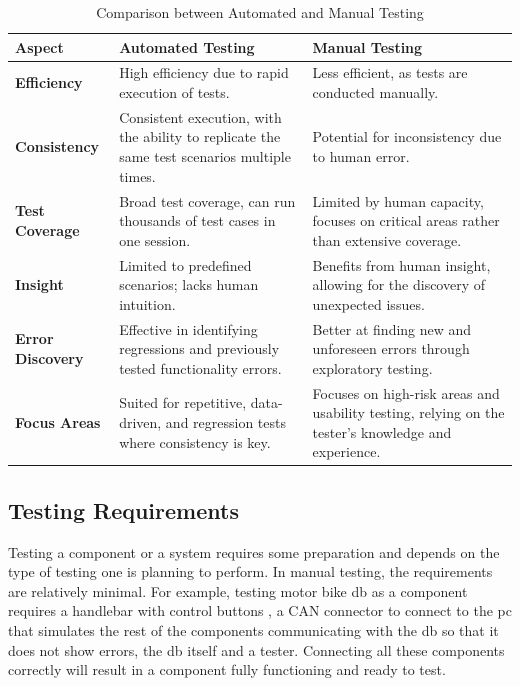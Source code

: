 \begin{table}[ht]
\centering
\caption{Comparison between Automated and Manual Testing \cite{leloudas2023, shiwangi2014}}
\label{tab:comparison automated vs manual testing}
\begin{tabular}{|p{3cm}|p{6cm}|p{6cm}|}
\hline
\textbf{Aspect} & \textbf{Automated Testing} & \textbf{Manual Testing} \\ \hline
\textbf{Efficiency} & High efficiency due to rapid execution of tests. & Less efficient, as tests are conducted manually. \\ \hline
\textbf{Consistency} & Consistent execution, with the ability to replicate the same test scenarios multiple times. & Potential for inconsistency due to human error. \\ \hline
\textbf{Test Coverage} & Broad test coverage, can run thousands of test cases in one session. & Limited by human capacity, focuses on critical areas rather than extensive coverage. \\ \hline
\textbf{Insight} & Limited to predefined scenarios; lacks human intuition. & Benefits from human insight, allowing for the discovery of unexpected issues. \\ \hline
\textbf{Error Discovery} & Effective in identifying regressions and previously tested functionality errors. & Better at finding new and unforeseen errors through exploratory testing. \\ \hline
\textbf{Focus Areas} & Suited for repetitive, data-driven, and regression tests where consistency is key. & Focuses on high-risk areas and usability testing, relying on the tester's knowledge and experience. \\ \hline
\end{tabular}
\end{table}

\subsection{Testing Requirements}
Testing a component or a system requires some preparation and depends on the type of testing one is planning to perform. In manual testing, the requirements are relatively minimal. For example, testing motor bike \gls{db} as a component requires a handlebar with control buttons , a CAN connector to connect to the pc that simulates the rest of the components communicating with the \gls{db} so that it does not show errors, the \gls{db} itself and a tester. Connecting all these components correctly will result in a component fully functioning and ready to test.

